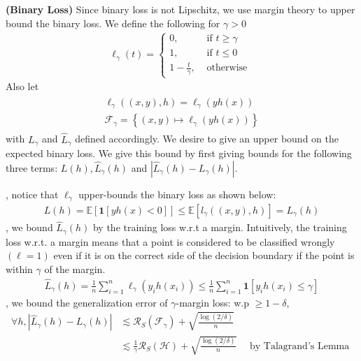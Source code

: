 \documentclass{article}
\newcommand{\bfs}[1]{\textbf{({#1}) }}
\begin{document}
\begin{exma}\bfs{Binary Loss}\label{exma:gdrtqe}
Since binary loss is not Lipschitz, we use margin theory to upper bound the binary loss. We define the following  for $\gamma>0$
\begin{align*}
\ell_{\gamma}(t)= \begin{cases}0, & \text { if } t \geq \gamma \\ 1, & \text { if } t \leq 0 \\ 1-\frac{t}{\gamma}, & \text { otherwise }\end{cases}
\end{align*}
Also let
\begin{align*}
\begin{gathered}
\ell_{\gamma}((x, y), h)=\ell_{\gamma}(y h(x)) \\
\mathcal{F}_{\gamma}=\left\{(x, y) \mapsto \ell_{\gamma}(y h(x))\right\}
\end{gathered}
\end{align*}
with $L_{\gamma}$ and $\hat{L}_{\gamma}$ defined accordingly.
We desire to give an upper bound on the expected binary loss. We give this bound by first giving bounds for the following three terms: $L(h), \hat{L}_{\gamma}(h)$ and $\left|\hat{L}_{\gamma}(h)-L_{\gamma}(h)\right|$.

, notice that $\ell_{\gamma}$ upper-bounds the binary loss as shown below:
\begin{align*}
L(h)=\mathbb{E}[\mathbf{1}[y h(x)<0]] \leq \mathbb{E}\left[l_{\gamma}((x, y), h)\right]=L_{\gamma}(h)
\end{align*}
, we bound $\hat{L}_{\gamma}(h)$ by the training loss w.r.t a margin. Intuitively, the training loss w.r.t. a margin means that a point is considered to be classified wrongly $(\ell=1)$ even if it is on the correct side of the decision boundary if the point is within $\gamma$ of the margin.
\begin{align*}
\hat{L}_{\gamma}(h)=\frac{1}{n} \sum_{i=1}^{n} \ell_{\gamma}\left(y_{i} h\left(x_{i}\right)\right) \leq \frac{1}{n} \sum_{i=1}^{n} \mathbf{1}\left[y_{i} h\left(x_{i}\right) \leq \gamma\right]
\end{align*}
, we bound the generalization error of $\gamma$-margin loss: w.p $\geq 1-\delta$,
\begin{align*} \forall h,\left|\hat{L}_{\gamma}(h)-L_{\gamma}(h)\right| & \lesssim \mathcal{R}_{S}\left(\mathcal{F}_{\gamma}\right)+\sqrt{\frac{\log (2 / \delta)}{n}} \\ & \lesssim \frac{1}{\gamma} \mathcal{R}_{S}(\mathcal{H})+\sqrt{\frac{\log (2 / \delta)}{n}} \quad \text { by Talagrand's Lemma } 
\end{align*}


\end{exma}
\end{document}

